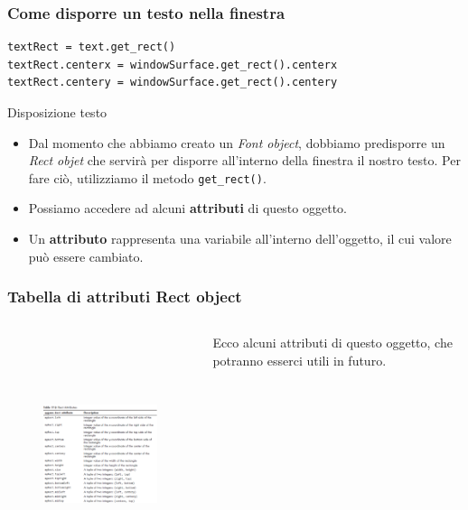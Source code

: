 \documentclass{beamer}
\begin{document}
\begin{frame}[fragile]
\frametitle{Come disporre un testo nella finestra}
\begin{lstlisting}
textRect = text.get_rect()
textRect.centerx = windowSurface.get_rect().centerx
textRect.centery = windowSurface.get_rect().centery
\end{lstlisting}

	\begin{block}{Disposizione testo}
		\begin{itemize}
			\item Dal momento che abbiamo creato un \textit{Font object}, dobbiamo predisporre un \textit{Rect objet} che servirà per disporre all'interno della finestra il nostro testo. Per fare ciò, utilizziamo il metodo \texttt{get\_rect()}.
			\item Possiamo accedere ad alcuni \textbf{attributi} di questo oggetto.
			\item Un \textbf{attributo} rappresenta una variabile all'interno dell'oggetto, il cui valore può essere cambiato.
		\end{itemize}
	\end{block}
\end{frame}

\begin{frame}[fragile]
\frametitle{Tabella di attributi Rect object}
\begin{columns}
	\begin{column}[T]{0.7\textwidth}
		\begin{figure}[t]
			\includegraphics[height=7cm, width=7cm]{images/attributiRect.png}
		\end{figure}
	\end{column}
	\begin{column}[T]{0.3\textwidth}
		Ecco alcuni attributi di questo oggetto, che potranno esserci utili in futuro.\\
		
	\end{column}
\end{columns}
\end{frame}
\end{document}
